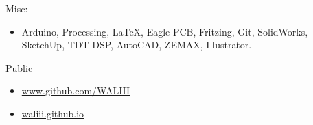 \documentclass[12pt]{article}
\newenvironment{innerlist}[1][\enskip\textbullet]%
        {\begin{itemize}[#1,leftmargin=*,parsep=0pt,itemsep=0pt,topsep=0pt,partopsep=0pt]}
        {\end{itemize}}
\newcommand{\halfblankline}{\quad\vspace{-0.5\baselineskip}\pagebreak[3]}
\begin{document}
\halfblankline

Misc:
%
\begin{innerlist}
    \item Arduino, Processing, \LaTeX, Eagle PCB, Fritzing, Git, SolidWorks, SketchUp, TDT DSP, AutoCAD, ZEMAX, Illustrator.
\end{innerlist}

\halfblankline

Public

%
\begin{innerlist}
    \item \href{http://www.github.com/WALIII} {www.github.com/WALIII}  
    \item \href{http://waliii.github.io} {waliii.github.io}
        \end{innerlist}
\end{document}
